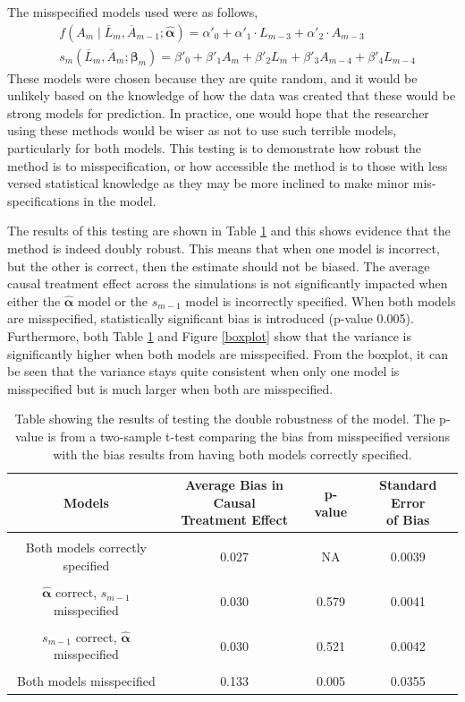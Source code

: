 The misspecified models used were as follows, 
\begin{align} 
&f(A_m \mid \overline{L}_m, \overline{A}_{m-1}; \hat{\mathbf{\alpha}}) = \alpha'_{0} + \alpha'_{1} \cdot L_{m-3} + \alpha'_{2} \cdot A_{m-3} \\ 
&s_{m}(\overline{L}_{m}, \overline{A}_{m};\mathbf{\beta}_{m}) = \beta'_0 + \beta'_1 A_{m} +\beta'_2 L_m  +\beta'_3 A_{m-4} +  \beta'_4 L_{m-4} 
 \end{align} 
These models were chosen because they are quite random, and it would be unlikely based on the knowledge of how the data was created that these would be strong models for prediction.  In practice, one would hope that the researcher using these methods would be wiser as not to use such terrible models, particularly for both models.  This testing is to demonstrate how robust the method is to misspecification, or how accessible the method is to those with less versed statistical knowledge as they may be more inclined to make minor mis-specifications in the model.  

The results of this testing are shown in Table \ref{doubletest} and this shows evidence that the method is indeed doubly robust.  This means that when one model is incorrect, but the other is correct, then the estimate should not be biased.  The average causal treatment effect across the simulations is not significantly impacted when either the $\hat{\mathbf{\alpha}}$ model or the $s_{m-1}$ model is incorrectly specified.  When both models are misspecified, statistically significant bias is introduced (p-value 0.005).  Furthermore, both Table \ref{doubletest} and Figure \ref{boxplot} show that the variance is significantly higher when both models are misspecified.  From the boxplot, it can be seen that the variance stays quite consistent when only one model is misspecified but is much larger when both are misspecified.  


\begin{table}[h!]
\centering
\begin{tabular} {c | c  c c}
Models & \shortstack{Average Bias in Causal \\ Treatment Effect} & p-value & \shortstack{Standard Error\\ of Bias} \\ 
\hline  \\
Both models correctly specified &0.027 & NA  & 0.0039\\ \\
$\hat{\mathbf{\alpha}}$ correct, $s_{m-1}$ misspecified & 0.030 & 0.579 & 0.0041\\ \\
$s_{m-1}$ correct, $\hat{\mathbf{\alpha}}$ misspecified& 0.030 & 0.521 &0.0042 \\ \\
Both models misspecified & 0.133 & 0.005 & 0.0355 
\end{tabular} \\
\centering
\caption{Table showing the results of testing the double robustness of the model.  The p-value is from a two-sample t-test comparing the bias from misspecified versions with the bias results from having both models correctly specified. \label{doubletest}}
\end{table}

